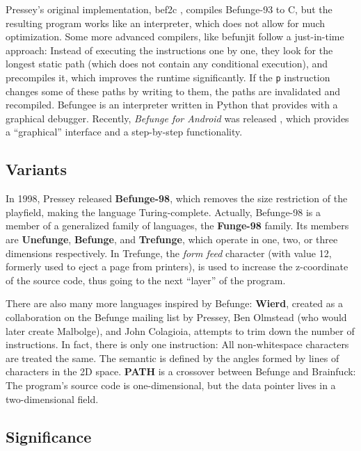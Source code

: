 Pressey's original implementation, bef2c \cite{pressey1993befunge}, compiles Befunge-93 to C, but the resulting program works like an interpreter, which does not allow for much optimization. Some more advanced compilers, like befunjit \cite{toncean_befunge} follow a just-in-time approach: Instead of executing the instructions one by one, they look for the longest static path (which does not contain any conditional execution), and precompiles it, which improves the runtime significantly. If the \texttt{p} instruction changes some of these paths by writing to them, the paths are invalidated and recompiled. Befungee \cite{mcenroe_befunge} is an interpreter written in Python that provides with a graphical debugger. Recently, \emph{Befunge for Android} was released \cite{alexander_befunge}, which provides a “graphical” interface and a step-by-step functionality.

\subsection{Variants}

In 1998, Pressey released \textbf{Befunge-98}, which removes the size restriction of the playfield, making the language Turing-complete. Actually, Befunge-98 is a member of a generalized family of languages, the \textbf{Funge-98} family. Its members are \textbf{Unefunge}, \textbf{Befunge}, and \textbf{Trefunge}, which operate in one, two, or three dimensions respectively. In Trefunge, the \emph{form feed} character (with \ascii{} value 12, formerly used to eject a page from printers), is used to increase the z-coordinate of the source code, thus going to the next “layer” of the program.

There are also many more languages inspired by Befunge: \textbf{Wierd}, created as a collaboration on the Befunge mailing list by Pressey, Ben Olmstead (who would later create Malbolge), and John Colagioia, attempts to trim down the number of instructions. In fact, there is only one instruction: All non-whitespace characters are treated the same. The semantic is defined by the angles formed by lines of characters in the 2D space. \textbf{PATH} is a crossover between Befunge and Brainfuck: The program's source code is one-dimensional, but the data pointer lives in a two-dimensional field.

\subsection{Significance}

